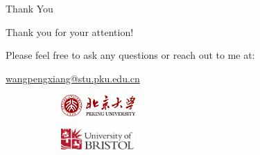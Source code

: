 \documentclass[
  ignorenonframetext,
  aspectratio=169,
]{beamer}
\begin{document}
\begin{frame}{Thank You}
\label{thank-you}
\centering \Large

Thank you for your attention!

\hfill\break

Please feel free to ask any questions or reach out to me at:

\url{wangpengxiang@stu.pku.edu.cn}

\vfill

\begin{figure}
  \centering
  \begin{subfigure}{0.2\textwidth}
    \centering
    \includegraphics[height=0.8cm]{../assets/pku-logo.png}
  \end{subfigure}
  \hspace{0.5cm}
  \begin{subfigure}{0.2\textwidth}
    \centering
    \includegraphics[height=0.8cm]{../assets/uob-logo.png}
  \end{subfigure}
\end{figure}
\end{frame}
\end{document}
